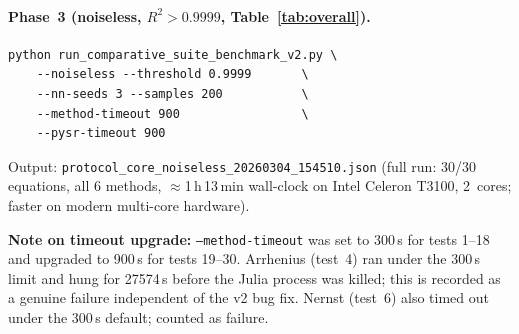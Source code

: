 \paragraph{Phase~3 (noiseless, $R^2>0.9999$, Table~\ref{tab:overall}).}
\begin{verbatim}
python run_comparative_suite_benchmark_v2.py \
    --noiseless --threshold 0.9999       \
    --nn-seeds 3 --samples 200           \
    --method-timeout 900                 \
    --pysr-timeout 900
\end{verbatim}
Output: \texttt{protocol\_core\_noiseless\_20260304\_154510.json}
(full run: 30/30 equations, all 6 methods, $\approx$1\,h\,13\,min wall-clock
on Intel Celeron T3100, 2~cores; faster on modern multi-core hardware).

\textbf{Note on timeout upgrade:} \texttt{--method-timeout} was set to 300\,s
for tests 1--18 and upgraded to 900\,s for tests 19--30. Arrhenius (test~4)
ran under the 300\,s limit and hung for 27574\,s before the Julia process was
killed; this is recorded as a genuine failure independent of the v2 bug fix.
Nernst (test~6) also timed out under the 300\,s default; counted as failure.
